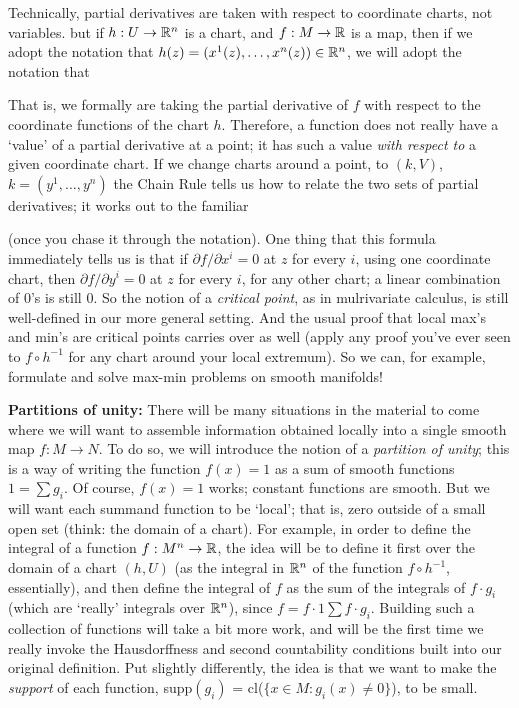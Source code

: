\ssk

Technically, partial derivatives are taken with respect to coordinate charts, not variables.
but if $h:U\rightarrow {\Bbb R}^n$ is a chart, and $f:M\rightarrow {\Bbb R}$ is a map, then
if we adopt the notation that $h(z)=(x^1(z),\ldots ,x^n(z))\in {\Bbb R}^n$, we will adopt 
the notation that 


\noindent That is, we formally are taking the partial derivative of $f$ with respect to the
coordinate functions of the chart $h$. Therefore, a function does 
not really have a `value' of a partial derivative at a point; it has such a value 
{\it with respect to} a given coordinate chart. If we change charts around a point, to
$(k,V)$, $k=(y^1,\ldots ,y^n)$ the Chain Rule tells us how to relate the two sets of 
partial derivatives; it works out to the familiar


\noindent (once you chase it through the notation). One thing that this formula
immediately tells us is that if $\partial f/\partial x^i = 0$ at $z$ for every $i$,
using one coordinate chart, 
then $\partial f/\partial y^i = 0$ at $z$ for every $i$, for any other chart;
a linear combination of $0$'s is still $0$. So the notion of a {\it critical point},
as in mulrivariate calculus, is still well-defined in our more general setting. And
the usual proof that local max's and min's are critical points carries over as
well (apply any proof you've ever seen to $f\circ h^{-1}$ for any chart around
your local extremum). So we can, for example, formulate and solve max-min problems
on smooth manifolds!

\msk

{\bf Partitions of unity:} There will be many situations in the material to come where we will want to assemble information
obtained locally into a single smooth map $f:M\rightarrow N$. To do so, we will introduce the
notion of a {\it partition of unity}; this is a way of writing the function $f(x)=1$ as a sum
of smooth functions $1=\sum g_i$. Of course, $f(x)=1$ works; constant functions are smooth. 
But we will want each
summand function to be `local'; that is, zero outside of a small open set (think: the domain of a chart).
For example, in order to define the integral of a function $f:M^n\rightarrow {\Bbb R}$, the idea will be to 
define it first over the domain of a chart $(h,U)$ (as the integral in ${\Bbb R}^n$ of the function
$f\circ h^{-1}$, essentially), and then define the integral of $f$ as the sum of the integrals
of $f\cdot g_i$ (which are `really' integrals over ${\Bbb R}^n$), since $f = f\cdot 1 \sum f\cdot g_i$.
Building such a collection of functions will take a bit more work, and will be the first time we 
really invoke the Hausdorffness and
second countability conditions built into our original definition. 
Put slightly differently, the idea is that 
we want to make the
{\it support} of each function, supp$(g_i)$ = cl($\{x\in M : g_i(x)\neq 0\}$), to be small.


